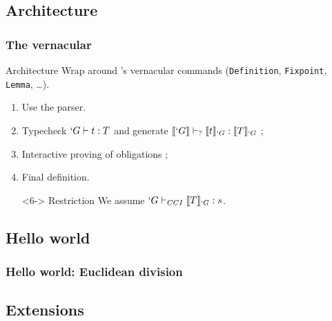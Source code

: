 \subsection{Architecture}
\begin{frame}[t]
  \frametitle{The \Program vernacular}
  
  \begin{block}{Architecture}
    Wrap around \Coq{}'s vernacular commands (\texttt{Definition},
    \texttt{Fixpoint}, \texttt{Lemma}, \ldots).
    
    \begin{enumerate}
    \item<2-> Use the \Coq{} parser.
    \item<3-> Typecheck $`G \vdash t : T$ and generate
      $\llbracket `G \rrbracket \vdash_{?} \llbracket t \rrbracket_{`G} : \llbracket T \rrbracket_{`G}$ ;
    \item<4-> Interactive proving of obligations ;
    \item<5-> Final definition.
    \item[]<6-> \alert{Restriction} We assume $`G \vdash_{CCI} \llbracket T \rrbracket_{`G} : s$. %
    \end{enumerate}
  \end{block}
  
  
\end{frame}

\subsection{Hello world}
\begin{frame}
  \frametitle{Hello world: Euclidean division}

  \begin{center}
  \end{center}
\end{frame}

\subsection{Extensions}

